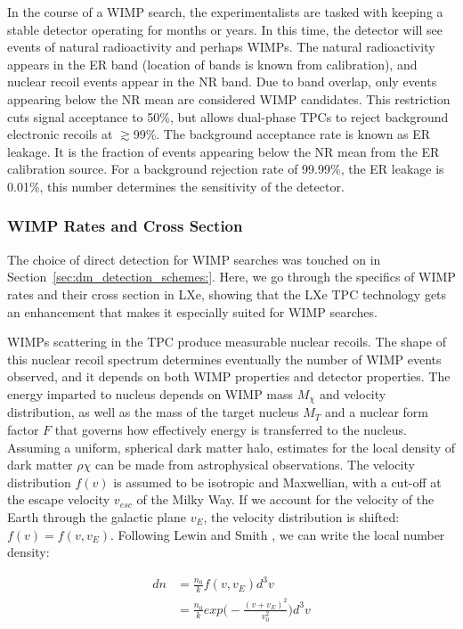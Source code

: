 In the course of a \ac{WIMP} search, the experimentalists are tasked with keeping a stable detector operating for months or years. In this time, the detector will see events of natural radioactivity and perhaps \ac{WIMP}s. The natural radioactivity appears in the \ac{ER} band (location of bands is known from calibration), and nuclear recoil events appear in the \ac{NR} band. Due to band overlap, only events appearing below the \ac{NR} mean are considered \ac{WIMP} candidates. This restriction cuts signal acceptance to 50\%, but allows dual-phase \ac{TPC}s to reject background electronic recoils at $\gtrsim$99\%. The background acceptance rate is known as \ac{ER} leakage. It is the fraction of events appearing below the \ac{NR} mean from the \ac{ER} calibration source. For a background rejection rate of 99.99\%, the \ac{ER} leakage is 0.01\%, this number determines the sensitivity of the detector.


\subsubsection{WIMP Rates and Cross Section}
\label{sec:wimp_rates}
The choice of direct detection for \ac{WIMP} searches was touched on in Section~\ref{sec:dm_detection_schemes:}. Here, we go through the specifics of \ac{WIMP} rates and their cross section in \ac{LXe}, showing that the \ac{LXe} \ac{TPC} technology gets an enhancement that makes it especially suited for \ac{WIMP} searches.

\ac{WIMP}s scattering in the \ac{TPC} produce measurable nuclear recoils. The shape of this nuclear recoil spectrum determines eventually the number of \ac{WIMP} events observed, and it depends on both \ac{WIMP} properties and detector properties. The energy imparted to nucleus depends on \ac{WIMP} mass $M_{\chi}$ and velocity distribution, as well as the mass of the target nucleus $M_{T}$ and a nuclear form factor $F$ that governs how effectively energy is transferred to the nucleus. Assuming a uniform, spherical dark matter halo, estimates for the local density of dark matter $\rho{\chi}$ can be made from astrophysical observations. The velocity distribution $f(v)$ is assumed to be isotropic and Maxwellian, with a cut-off at the escape velocity $v_{esc}$ of the Milky Way. If we account for the velocity of the Earth through the galactic plane $v_{E}$, the velocity distribution is shifted: $f(v) = f(v,v_{E})$. Following Lewin and Smith \cite{Lewin1996}, we can write the local number density:


\begin{equation}
\begin{split}
dn &= \frac{n_{0}}{k} f(v, v_{E}) d^{3}v \\
     &= \frac{n_{0}}{k} exp \big( - \frac{(v + v_{E})^{2} }{ v_{0}^{2}} \big) d^{3}v 
\end{split}
\end{equation}


